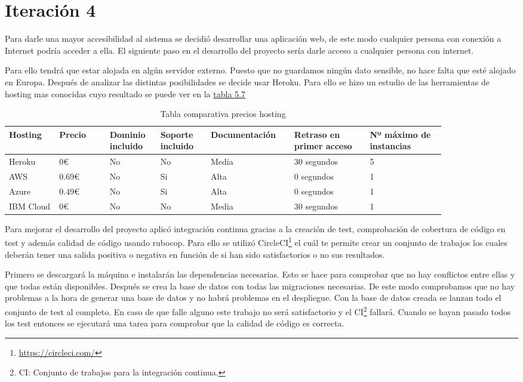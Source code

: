 \section{Iteración 4}

Para darle una mayor accesibilidad al sistema se decidió desarrollar
una aplicación web, de este modo cualquier persona con conexión a
Internet podría acceder a ella. El siguiente paso en el desarrollo
del proyecto sería darle acceso a cualquier persona con internet.

Para ello tendrá que estar alojada en algún servidor externo.
Puesto que no guardamos ningún dato sensible, no hace falta
que esté alojado en Europa. Después de analizar las distintas posibilidades
se decide usar Heroku. Para ello se hizo un estudio de las herramientas
de hosting mas conocidas cuyo resultado se puede ver en la \hyperref[tab:Tabla comparativa precios hosting]{tabla 5.7}

\begin{longtable}{|p{0.1\linewidth}p{0.1\linewidth}p{0.1\linewidth}p{0.1\linewidth}p{0.15\linewidth}p{0.15\linewidth}p{0.15\linewidth}|}
  \caption{Tabla comparativa precios hosting}
  \label{tab:Tabla comparativa precios hosting}
  \endfirsthead
  \endhead
  \hline
  \multicolumn{1}{|l}{Hosting} & Precio & Dominio incluido & Soporte incluido & Documentación & Retraso en primer acceso & Nº máximo de instancias \\ \hline
  Heroku & 0€ & No & No & Media & 30 segundos & 5 \\ \hline
  AWS & 0.69€ & No & Si & Alta & 0 segundos & 1 \\ \hline
  Azure & 0.49€ & No & Si & Alta & 0 segundos & 1 \\ \hline
  IBM Cloud & 0€ & No & No & Media & 30 segundos & 1 \\ \hline
\end{longtable}

Para mejorar el desarrollo del proyecto aplicó integración continua gracias
a la creación de test, comprobación de cobertura de código en test y además
calidad de código usando rubocop. Para ello se utilizó CircleCI\footnote{\url{https://circleci.com/}} el cuál te
permite crear un conjunto de trabajos los cuales deberán tener una salida
positiva o negativa en función de si han sido satisfactorios o no sus resultados.

Primero se descargará la máquina e instalarán las dependencias necesarias.
Esto se hace para comprobar que no hay conflictos entre ellas y que todas
están disponibles. Después se crea la base de datos con todas las migraciones
necesarias. De este modo comprobamos que no hay problemas a la hora
de generar una base de datos y no habrá problemas en el despliegue.
Con la base de datos creada se lanzan todo el conjunto de test al completo.
En caso de que falle alguno este trabajo no será satisfactorio y el CI\footnote{CI: Conjunto de trabajos para la integración continua.}
fallará. Cuando se hayan pasado todos los test entonces se ejecutará
una tarea para comprobar que la calidad de código es correcta.

